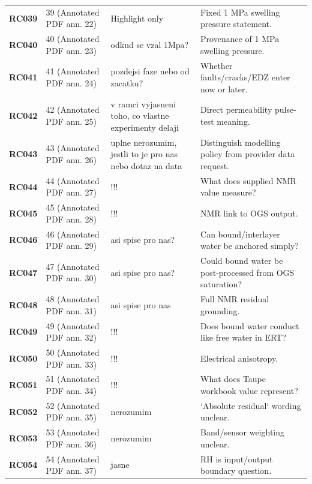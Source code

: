\begin{longtable}{@{}L{0.10\textwidth} L{0.14\textwidth} L{0.31\textwidth} L{0.37\textwidth}@{}}
\addlinespace[0.16em]
\textbf{RC039} & 39 (Annotated PDF ann. 22) & Highlight only & Fixed 1 MPa swelling pressure statement.\\
\addlinespace[0.16em]
\textbf{RC040} & 40 (Annotated PDF ann. 23) & odkud se vzal 1Mpa? & Provenance of 1 MPa swelling pressure.\\
\addlinespace[0.16em]
\textbf{RC041} & 41 (Annotated PDF ann. 24) & pozdejsi faze nebo od zacatku? & Whether faults/cracks/EDZ enter now or later.\\
\addlinespace[0.16em]
\textbf{RC042} & 42 (Annotated PDF ann. 25) & v ramci vyjasneni toho, co vlastne experimenty delaji & Direct permeability pulse-test meaning.\\
\addlinespace[0.16em]
\textbf{RC043} & 43 (Annotated PDF ann. 26) & uplne nerozumim, jestli to je pro nas nebo dotaz na data & Distinguish modelling policy from provider data request.\\
\addlinespace[0.16em]
\textbf{RC044} & 44 (Annotated PDF ann. 27) & !!! & What does supplied NMR value measure?\\
\addlinespace[0.16em]
\textbf{RC045} & 45 (Annotated PDF ann. 28) & !!! & NMR link to OGS output.\\
\addlinespace[0.16em]
\textbf{RC046} & 46 (Annotated PDF ann. 29) & asi spise pro nas? & Can bound/interlayer water be anchored simply?\\
\addlinespace[0.16em]
\textbf{RC047} & 47 (Annotated PDF ann. 30) & asi spise pro nas? & Could bound water be post-processed from OGS saturation?\\
\addlinespace[0.16em]
\textbf{RC048} & 48 (Annotated PDF ann. 31) & asi spise pro nas & Full NMR residual grounding.\\
\addlinespace[0.16em]
\textbf{RC049} & 49 (Annotated PDF ann. 32) & !!! & Does bound water conduct like free water in ERT?\\
\addlinespace[0.16em]
\textbf{RC050} & 50 (Annotated PDF ann. 33) & !!! & Electrical anisotropy.\\
\addlinespace[0.16em]
\textbf{RC051} & 51 (Annotated PDF ann. 34) & !!! & What does Taupe workbook value represent?\\
\addlinespace[0.16em]
\textbf{RC052} & 52 (Annotated PDF ann. 35) & nerozumim & `Absolute residual` wording unclear.\\
\addlinespace[0.16em]
\textbf{RC053} & 53 (Annotated PDF ann. 36) & nerozumim & Band/sensor weighting unclear.\\
\addlinespace[0.16em]
\textbf{RC054} & 54 (Annotated PDF ann. 37) & jasne & RH is input/output boundary question.\\

\end{longtable}
